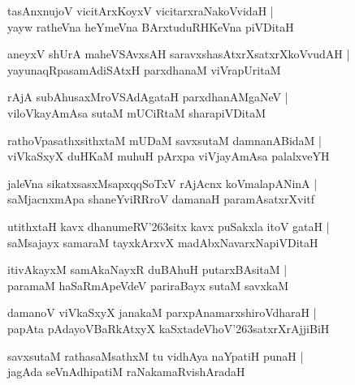 \documentclass[twoside,12pt,openright]{book}
\def\S{\char'263}
\newcounter{shloka}[chapter]
\begin{document}
\begin{shloka}%
tasAnxnujoV vicitArxKoyxV vicitarxraNakoVvidaH |\\
yayw ratheVna heYmeVna BArxtuduRHKeVna piVDitaH 
\end{shloka}

\begin{shloka}%
aneyxV shUrA maheVSAvxsAH saravxshasAtxrXsatxrXkoVvudAH |\\
yayunaqRpasamAdiSAtxH parxdhanaM viVrapUritaM 
\end{shloka}

\begin{shloka}%
rAjA subAhusaxMroVSAdAgataH parxdhanAMgaNeV |\\
viloVkayAmAsa sutaM mUCiRtaM sharapiVDitaM 
\end{shloka}

\begin{shloka}%
rathoVpasathxsithxtaM mUDaM  savxsutaM damnanABidaM |\\
viVkaSxyX duHKaM muhuH pArxpa viVjayAmAsa palalxveYH 
\end{shloka}

\begin{shloka}%
jaleVna sikatxsasxMsapxqqSoTxV rAjAcnx koVmalapANinA |\\
saMjacnxmApa shaneYviRRroV damanaH paramAsatxrXvitf
\end{shloka}

\begin{shloka}%
utithxtaH kavx dhanumeRV\S sitx kavx puSakxla itoV gataH |\\
saMsajayx samaraM tayxkArxvX madAbxNavarxNapiVDitaH 
\end{shloka}

\begin{shloka}%
itivAkayxM samAkaNayxR duBAhuH putarxBAsitaM |\\
paramaM haSaRmApeVdeV pariraBayx sutaM savxkaM 
\end{shloka}

\begin{shloka}%
damanoV viVkaSxyX janakaM parxpAnamarxshiroVdharaH |\\
papAta pAdayoVBaRkAtxyX kaSxtadeVhoV\S satxrXrAjjiBiH
\end{shloka}

\begin{shloka}%
savxsutaM rathasaMsathxM tu vidhAya naYpatiH punaH |\\
jagAda seVnAdhipatiM raNakamaRvishAradaH 
\end{shloka}
\end{document}
